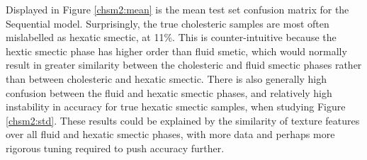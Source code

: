 \documentclass[12pt]{article}
\begin{document}
Displayed in Figure \ref{chsm2:mean} is the mean test set confusion matrix for the Sequential model. Surprisingly, the true cholesteric samples are most often mislabelled as hexatic smectic, at 11\%. This is counter-intuitive because the hextic smectic phase has higher order than fluid smetic, which would normally result in greater similarity between the cholesteric and fluid smectic phases rather than between cholesteric and hexatic smectic. There is also generally high confusion between the fluid and hexatic smectic phases, and relatively high instability in accuracy for true hexatic smectic samples, when studying Figure \ref{chsm2:std}. These results could be explained by the similarity of texture features over all fluid and hexatic smectic phases, with more data and perhaps more rigorous tuning required to push accuracy further.
\end{document}
